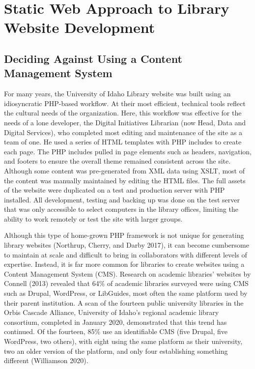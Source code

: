 \documentclass{book}
\begin{document}
\hypertarget{static-web-approach-to-library-website-development}{%
\chapter{Static Web Approach to Library Website
Development}\label{static-web-approach-to-library-website-development}}

\hypertarget{deciding-against-using-a-content-management-system}{%
\section{Deciding Against Using a Content Management
System}\label{deciding-against-using-a-content-management-system}}

For many years, the University of Idaho Library website was built using an
idiosyncratic PHP-based workflow. At their most efficient, technical tools
reflect the cultural needs of the organization. Here, this workflow was
effective for the needs of a lone developer, the Digital Initiatives Librarian
(now Head, Data and Digital Services), who completed most editing and
maintenance of the site as a team of one. He used a series of HTML templates
with PHP includes to create each page. The PHP includes pulled in page
elements such as headers, navigation, and footers to ensure the overall theme
remained consistent across the site. Although some content was pre-generated
from XML data using XSLT, most of the content was manually maintained by
editing the HTML files. The full assets of the website were duplicated on a
test and production server with PHP installed. All development, testing and
backing up was done on the test server that was only accessible to select
computers in the library offices, limiting the ability to work remotely or
test the site with larger groups.

Although this type of home-grown PHP framework is not unique for generating
library websites (Northrup, Cherry, and Darby 2017), it can become cumbersome
to maintain at scale and difficult to bring in collaborators with different
levels of expertise. Instead, it is far more common for libraries to create
websites using a Content Management System (CMS). Research on academic
libraries' websites by Connell (2013) revealed that 64\% of academic libraries
surveyed were using CMS such as Drupal, WordPress, or LibGuides, most often
the same platform used by their parent institution. A scan of the fourteen
public university libraries in the Orbis Cascade Alliance, University of
Idaho's regional academic library consortium, completed in January 2020,
demonstrated that this trend has continued. Of the fourteen, 85\% use an
identifiable CMS (five Drupal, five WordPress, two others), with eight using
the same platform as their university, two an older version of the platform,
and only four establishing something different (Williamson 2020).
\end{document}
